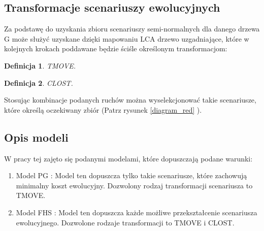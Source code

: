 \documentclass[licencjacka]{pracamgr}
\newtheorem{defi}{Definicja}[section]
\begin{document}
\subsection{Transformacje scenariuszy ewolucyjnych}

Za podstawę do uzyskania zbioru scenariuszy semi-normalnych dla danego drzewa G może służyć uzyskane dzięki mapowaniu LCA drzewo uzgadniające, które w kolejnych krokach poddawane będzie ściśle określonym transformacjom: 

\begin{defi}\label{TMOVE}
  TMOVE.
\end{defi}

\begin{defi}\label{CLOST}
  CLOST.
\end{defi}

Stosując kombinacje podanych ruchów można wyselekcjonować takie scenariusze, które określą oczekiwany zbiór (Patrz rysunek \ref{diagram_red} ).

\subsection{Opis modeli}

W pracy tej zajęto się podanymi modelami, które dopuszczają podane warunki:
\begin{enumerate}
\item Model PG \cite{PG}: Model ten dopuszcza tylko takie scenariusze, które zachowują minimalny koszt ewolucyjny. Dozwolony rodzaj transformacji scenariusza to TMOVE.
\item Model FHS \cite{FHS}: Model ten dopuszcza każde możliwe przekształcenie scenariusza ewolucyjnego. Dozwolone rodzaje transformacji to TMOVE i CLOST.
\end{enumerate}
\end{document}
